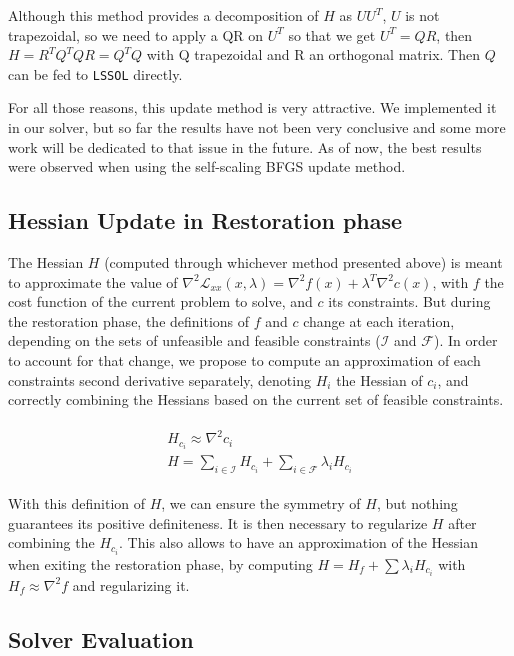 Although this method provides a decomposition of $H$ as $U U^T$, $U$ is not trapezoidal, so we need to apply a QR on $U^T$ so that we get $U^T=QR$, then $H=R^T Q^T Q R=Q^T Q$ with Q trapezoidal and R an orthogonal matrix.
Then $Q$ can be fed to {\tt LSSOL} directly.

For all those reasons, this update method is very attractive.
We implemented it in our solver, but so far the results have not been very conclusive and some more work will be dedicated to that issue in the future.
As of now, the best results were observed when using the self-scaling BFGS update method.

\subsection{Hessian Update in Restoration phase}
\label{sub:hessian_update_in_restoration_phase}

The Hessian $H$ (computed through whichever method presented above) is meant to approximate the value of $\nabla^2 \mathcal{L}_{xx}(x,\lambda) = \nabla^2 f(x) + \lambda^T \nabla^2 c(x)$, with $f$ the cost function of the current problem to solve, and $c$ its constraints.
But during the restoration phase, the definitions of $f$ and $c$ change at each iteration, depending on the sets of unfeasible and feasible constraints ($\mathcal{I}$ and $\mathcal{F}$).
In order to account for that change, we propose to compute an approximation of each constraints second derivative separately, denoting $H_i$ the Hessian of $c_i$, and correctly combining the Hessians based on the current set of feasible constraints.

\begin{align}
  \begin{split}
    H_{c_i} \approx \nabla^2 c_i\\
    H = \sum_{i\in \mathcal{I}}H_{c_i} + \sum_{i\in \mathcal{F}}\lambda_i H_{c_i}
  \end{split}
\end{align}

With this definition of $H$, we can ensure the symmetry of $H$, but nothing guarantees its positive definiteness.
It is then necessary to regularize $H$ after combining the $H_{c_i}$.
This also allows to have an approximation of the Hessian when exiting the restoration phase, by computing $H = H_f + \sum \lambda_i H_{c_i}$ with $H_f \approx \nabla^2 f$ and regularizing it.

\subsection{Solver Evaluation}
\label{sub:solver_evaluation}

